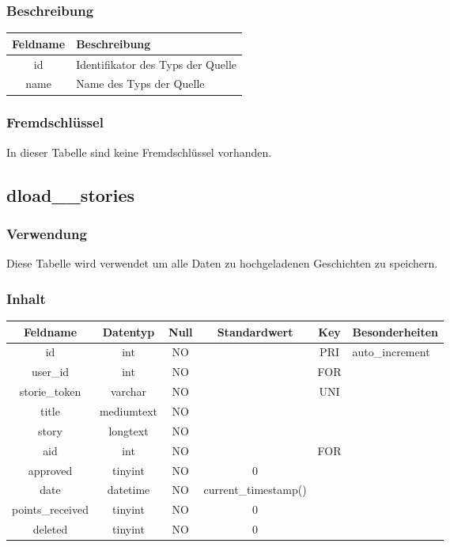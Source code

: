 \subsubsection{Beschreibung}
\begin{table}[H]
	\begin{tabular}{|c|p{12cm}|}
		\hline
		\textbf{Feldname} & \textbf{Beschreibung}\\ \hline
		id   & Identifikator des Typs der Quelle \\ \hline
		name & Name des Typs der Quelle \\ \hline
	\end{tabular}
\end{table}
\subsubsection{Fremdschlüssel}
In dieser Tabelle sind keine Fremdschlüssel vorhanden.
\subsection{dload\_\_stories}
\subsubsection{Verwendung} Diese Tabelle wird verwendet um alle Daten zu hochgeladenen Geschichten zu speichern.
\subsubsection{Inhalt}
\begin{table}[H]
	\begin{tabular}{|c|c|c|c|c|p{3.5cm}|}
		\hline
		\textbf{Feldname} & \textbf{Datentyp} & \textbf{Null} & \textbf{Standardwert} & \textbf{Key}   & \textbf{Besonderheiten} \\ \hline
		id & int & NO &  & PRI & auto\_increment \\ \hline
		user\_id & int & NO &  & FOR & \\ \hline
		storie\_token & varchar & NO &  & UNI & \\ \hline
		title & mediumtext & NO &  &  & \\ \hline
		story & longtext & NO &  &  & \\ \hline
		aid & int & NO &  & FOR & \\ \hline
		approved & tinyint & NO & 0 &  & \\ \hline
		date & datetime & NO & current\_timestamp() &  & \\ \hline
		points\_received & tinyint & NO & 0 &  & \\ \hline
		deleted & tinyint & NO & 0 &  & \\ \hline
	\end{tabular}
\end{table}
